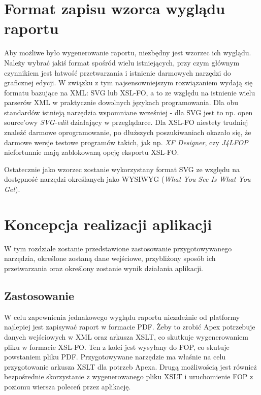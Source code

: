 \documentclass[11pt,a4paper]{article}
\begin{document}
\section{Format zapisu wzorca wyglądu raportu}\label{sec:formatywzorce}
Aby możliwe było wygenerowanie raportu, niezbędny jest wzorzec ich wyglądu. Należy wybrać jakiś format spośród wielu istniejących, przy czym głównym czynnikiem jest łatwość przetwarzania i istnienie darmowych narzędzi do graficznej edycji. W związku z tym najsensowniejszym rozwiązaniem wydają się formatu bazujące na XML: SVG lub XSL-FO, a to ze względu na istnienie wielu parserów XML w praktycznie dowolnych językach programowania. Dla obu standardów istnieją narzędzia wspomniane wcześniej - dla SVG jest to np. open source'owy \emph{SVG-edit} działający w przeglądarce. Dla XSL-FO niestety trudniej znaleźć darmowe oprogramowanie, po dłuższych poszukiwaniach okazało się, że darmowe wersje testowe programów takich, jak np. \emph{XF Designer}, czy \emph{J4LFOP} niefortunnie mają zablokowaną opcję eksportu XSL-FO. 

Ostatecznie jako wzorzec zostanie wykorzystany format SVG ze względu na dostępność narzędzi określanych jako WYSIWYG (\emph{What You See Is What You Get}).

\section{Koncepcja realizacji aplikacji}
W tym rozdziale zostanie przedstawione zastosowanie przygotowywanego narzędzia, określone zostaną dane wejściowe, przybliżony sposób ich przetwarzania oraz określony zostanie wynik działania aplikacji.

\subsection{Zastosowanie}\label{sec:appZast}
W celu zapewnienia jednakowego wyglądu raportu niezależnie od platformy najlepiej jest zapisywać raport w formacie PDF. Żeby to zrobić Apex potrzebuje danych wejściowych w XML oraz arkusza XSLT, co skutkuje wygenerowaniem pliku w formacie XSL-FO. Ten z kolei jest wysyłany do FOP, co skutuje powstaniem pliku PDF. Przygotowywane narzędzie ma właśnie na celu przygotowanie arkusza XSLT dla potrzeb Apexa. Drugą możliwością jest również bezpośrednie skorzystanie z wygenerowanego pliku XSLT i uruchomienie FOP z poziomu wiersza poleceń przez aplikację. 
\end{document}
